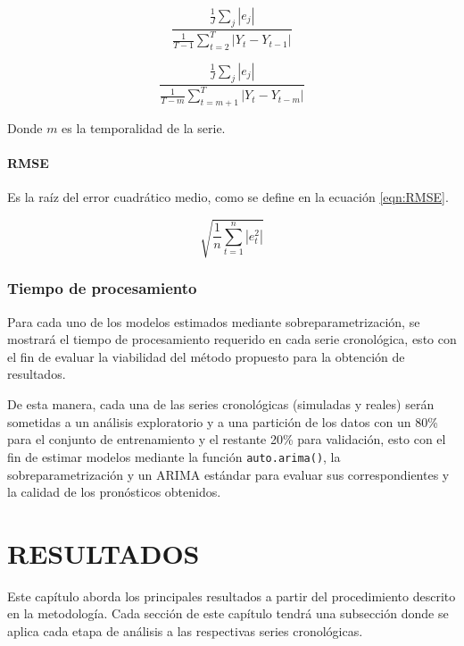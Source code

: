 \documentclass[
]{article}
\begin{document}
\begin{equation}
\label{eqn:MASE_no}
\frac{\frac{1}{J}\sum_j|e_j|}{\frac{1}{T-1}\sum_{t=2}^T|Y_t-Y_{t-1}|}
\end{equation}

\begin{equation}
\label{eqn:MASE_si}
\frac{\frac{1}{J}\sum_j|e_j|}{\frac{1}{T-m}\sum_{t=m+1}^T|Y_t-Y_{t-m}|}
\end{equation}

Donde \(m\) es la temporalidad de la serie.

\paragraph{RMSE}

Es la raíz del error cuadrático medio, como se define en la ecuación
\ref{eqn:RMSE}.

\begin{equation}
\label{eqn:RMSE}
\sqrt{\frac{1}{n}\sum_{t=1}^n |e_t^2|}
\end{equation}

\subsubsection{Tiempo de procesamiento}

Para cada uno de los modelos estimados mediante sobreparametrización, se
mostrará el tiempo de procesamiento requerido en cada serie cronológica,
esto con el fin de evaluar la viabilidad del método propuesto para la
obtención de resultados.

De esta manera, cada una de las series cronológicas (simuladas y reales)
serán sometidas a un análisis exploratorio y a una partición de los
datos con un 80\% para el conjunto de entrenamiento y el restante 20\%
para validación, esto con el fin de estimar modelos mediante la función
\texttt{auto.arima()}, la sobreparametrización y un ARIMA estándar para
evaluar sus correspondientes y la calidad de los pronósticos obtenidos.

\newpage

\section{RESULTADOS}

Este capítulo aborda los principales resultados a partir del
procedimiento descrito en la metodología. Cada sección de este capítulo
tendrá una subsección donde se aplica cada etapa de análisis a las
respectivas series cronológicas.
\end{document}
